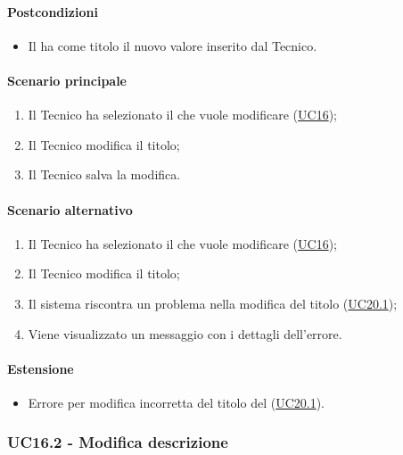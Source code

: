 \paragraph*{Postcondizioni}
\begin{itemize}
  \item Il  ha come titolo il nuovo valore inserito dal Tecnico.
\end{itemize}

\paragraph*{Scenario principale}
\begin{enumerate}
  \item Il Tecnico ha selezionato il  che vuole modificare (\hyperref[UC16]{UC16});
  \item Il Tecnico modifica il titolo;
  \item Il Tecnico salva la modifica.
\end{enumerate}

\paragraph*{Scenario alternativo}
\begin{enumerate}
  \item Il Tecnico ha selezionato il  che vuole modificare (\hyperref[UC16]{UC16});
  \item Il Tecnico modifica il titolo;
  \item Il sistema riscontra un problema nella modifica del titolo (\hyperref[UC20point1]{UC20.1});
  \item Viene visualizzato un messaggio con i dettagli dell'errore.
\end{enumerate}

\paragraph{Estensione}
\begin{itemize}
  \item Errore per modifica incorretta del titolo del  (\hyperref[UC20point1]{UC20.1}).
\end{itemize}


\subsubsection{UC16.2 - Modifica descrizione }\label{UC16point2}
